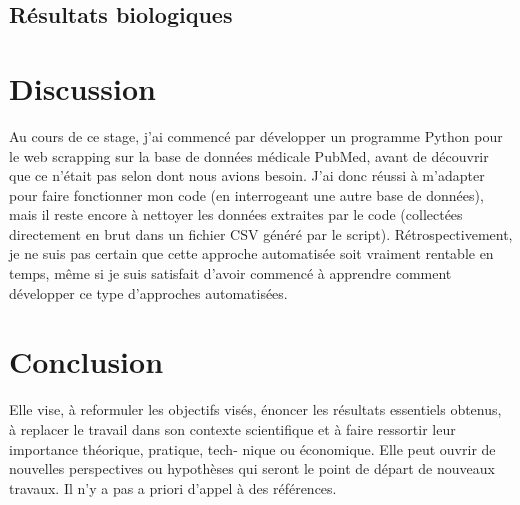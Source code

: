 \documentclass{book}
\begin{document}
\section{Résultats biologiques}

\thispagestyle{fancy}

\chapter{\label{Quatrième Chapitre}Discussion}
\noindent
Au cours de ce stage, j'ai commencé par développer un programme Python pour le
web scrapping sur la base de données médicale PubMed, avant de découvrir que ce
n'était pas selon dont nous avions besoin. J'ai donc réussi à m'adapter pour
faire fonctionner mon code (en interrogeant une autre base de données), mais il
reste encore à nettoyer les données extraites par le code (collectées
directement en brut dans un fichier CSV généré par le script).
Rétrospectivement, je ne suis pas certain que cette approche automatisée soit
vraiment rentable en temps, même si je suis satisfait d'avoir commencé à
apprendre comment développer ce type d'approches automatisées.

\lipsum[1]

\thispagestyle{fancy}

\chapter{\label{Cinquième Chapitre}Conclusion}
Elle vise, à reformuler les objectifs visés, énoncer les résultats essentiels
obtenus, à replacer le
travail dans son contexte scientifique et à faire ressortir leur importance
théorique, pratique, tech-
nique ou économique. Elle peut ouvrir de nouvelles perspectives ou hypothèses
qui seront le point
de départ de nouveaux travaux. Il n'y a pas a priori d'appel à des références.

\thispagestyle{fancy}

\newpage


\cite{clef1}
\thispagestyle{fancy}

\end{document}
